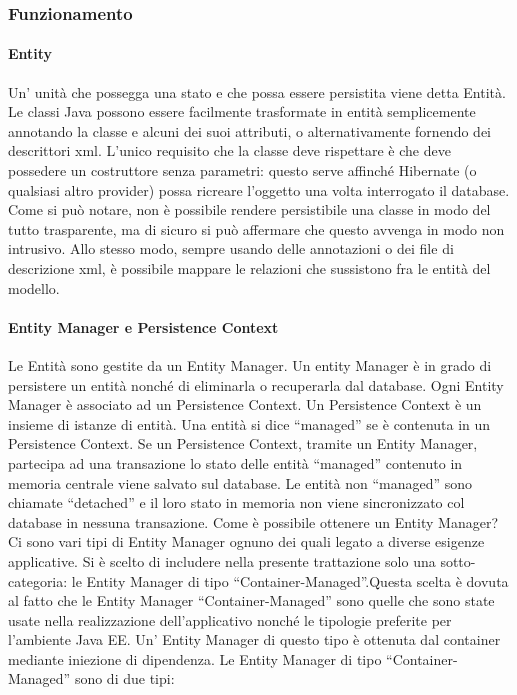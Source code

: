 \subsubsection{Funzionamento}
\paragraph{Entity}
Un' unità che possegga una stato e che possa essere persistita viene detta Entità. Le classi Java possono essere facilmente trasformate in entità semplicemente annotando la classe e alcuni dei suoi attributi, o alternativamente
fornendo dei descrittori xml. L'unico
requisito che la classe deve rispettare è che deve possedere un costruttore senza parametri: questo serve affinché Hibernate (o qualsiasi altro provider) possa ricreare l'oggetto una volta interrogato il database. Come si può notare, 
non è possibile rendere persistibile una classe in modo del tutto trasparente, ma di sicuro si può affermare che questo avvenga in modo non intrusivo. Allo stesso modo, sempre usando delle annotazioni o dei file di descrizione xml, 
è possibile mappare le relazioni che sussistono fra le entità del modello.

\paragraph{Entity Manager e Persistence Context}
Le Entità sono gestite da un Entity Manager. Un entity Manager è in grado di persistere un entità nonché di eliminarla o recuperarla dal database. Ogni Entity Manager è associato ad un Persistence Context. Un Persistence Context è un insieme di
istanze di entità. Una entità si dice ``managed'' se è contenuta in un Persistence Context. Se un Persistence Context, tramite un Entity Manager, partecipa ad una transazione lo stato delle entità ``managed'' contenuto in memoria
centrale viene salvato sul database. Le entità non ``managed'' sono chiamate ``detached'' e il loro stato in memoria non viene sincronizzato col database in nessuna transazione. Come è possibile ottenere un Entity Manager? Ci sono vari tipi
di Entity Manager ognuno dei quali legato a diverse esigenze applicative. Si è scelto di includere nella presente trattazione solo una sotto-categoria: le Entity Manager di tipo ``Container-Managed''.Questa scelta è dovuta al fatto che
le Entity Manager ``Container-Managed'' sono quelle che sono state usate nella realizzazione dell'applicativo nonché le tipologie preferite per l'ambiente Java EE. Un' Entity Manager di questo tipo è ottenuta dal container mediante iniezione
di dipendenza. Le Entity Manager di tipo ``Container-Managed'' sono di due tipi:

